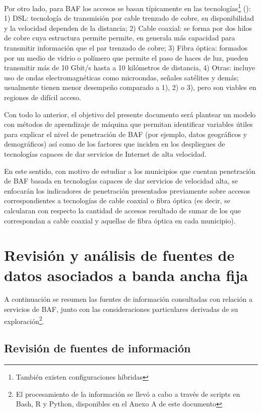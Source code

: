 \documentclass[9pt,twocolumn,twoside]{ilcss}
\begin{document}
Por otro lado, para BAF los accesos se basan típicamente en las tecnologías\footnote{También existen configuraciones híbridas} (\cite{moya2014telecomunicaciones}): 1) DSL: tecnología de transmisión por cable trenzado de cobre, su disponibilidad y la velocidad dependen de la distancia; 2) Cable coaxial: se forma por dos hilos de cobre cuya estructura permite permite, en generala más capacidad para transmitir información que el par trenzado de cobre; 3) Fibra óptica: formados por un medio de vidrio o polímero que permite el paso de haces de luz, pueden transmitir más de 10 Gbit/s hasta a 10 kilómetros de distancia, 4) Otras: incluye uso de ondas electromagnéticas como microondas, señales satélites y demás; usualmente  tienen menor desempeño comparado a 1), 2) o 3), pero son viables en regiones de difícil acceso.

Con todo lo anterior, el objetivo del presente documento será plantear un modelo con métodos de aprendizaje de máquina que permitan identificar variables útiles para explicar el nivel de penetración de BAF (por ejemplo, datos geográficos y demográficos) así como de los factores que inciden en los despliegues de tecnologías capaces de dar servicios de Internet de alta velocidad. 

En este sentido, con motivo de estudiar a los municipios que cuentan penetración de BAF basada en tecnologías capaces de dar servicios de velocidad alta, se enfocarán los indicadores de penetración presentados previamente sobre accesos correspondientes a tecnologías de cable coaxial o fibra óptica (es decir, se calcularan con respecto la cantidad de accesos resultado de sumar de los que correspondan a cable coaxial y aquellas de fibra óptica en cada municipio).

\section{Revisión y análisis de fuentes de datos asociados a banda ancha fija}

A continuación se resumen las fuentes de información consultadas con relación a servicios de BAF, junto con las consideraciones particulares derivadas de su exploración\footnote{El procesamiento de la información se llevó a cabo a través de scripts en Bash, R y Python, disponibles en el Anexo A de este documento}. 

\subsection{Revisión de fuentes de información}
\end{document}
